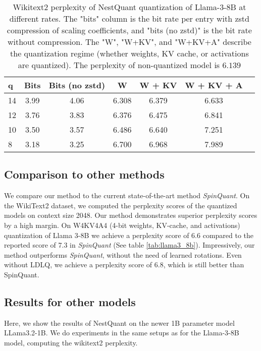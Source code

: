 \begin{table}
\centering
\scriptsize
\begin{tabular}{lcccccc}
    \toprule
\textbf{q}& \textbf{Bits} & \textbf{Bits (no zstd)} &  \textbf{W}&
\textbf{W + KV}&
\textbf{W + KV + A}\\    \midrule
    14 & 3.99& 4.06 & 6.308& 6.379& 6.633\\
    12 & 3.76& 3.83 & 6.376& 6.475& 6.841\\
    10 & 3.50& 3.57 & 6.486& 6.640& 7.251\\
    8 & 3.18& 3.25 & 6.700& 6.968& 7.989\\
    \bottomrule
\end{tabular}
\ifisicml\else\vspace{1em}\fi
\caption{Wikitext2 perplexity of NestQuant quantization of Llama-3-8B at different rates. The "bits" column is the bit rate per entry with zstd compression of scaling coefficients, and "bits (no zstd)" is the bit rate without compression. The "W", "W+KV", and "W+KV+A" describe the quantization regime (whether weights, KV cache, or activations are quantized). The perplexity of non-quantized model is $6.139$} 
\label{tab:llama3_ppl}
\end{table}


\subsection{Comparison to other methods}
We compare our method to the current state-of-the-art method \textit{SpinQuant}. On the WikiText2 dataset, we computed the perplexity scores of the quantized models on context size 2048. Our method demonstrates superior perplexity scores by a high margin. On W4KV4A4 (4-bit weights, KV-cache, and activations) quantization of Llama 3-8B we achieve a perplexity score of 6.6 compared to the reported score of 7.3 in \textit{SpinQuant} (See table \ref{tab:llama3_8b}). Impressively, our method outperforms \textit{SpinQuant}, without the need of learned rotations. Even without LDLQ, we achieve a perplexity score of 6.8, which is still better than SpinQuant.

\subsection{Results for other models}

Here, we show the results of NestQuant on the newer 1B parameter model LLama3.2-1B. We do experiments in the same setups as for the Llama-3-8B model, computing the wikitext2 perplexity.

